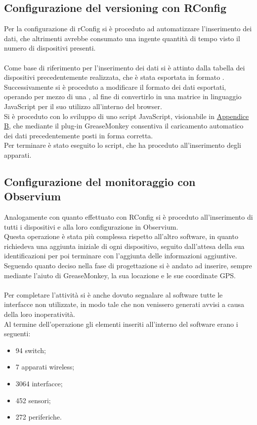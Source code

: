 \documentclass[Realizzazione.tex]{subfiles}
\begin{document}
\subsection{Configurazione del versioning con RConfig}
Per la configurazione di rConfig si è proceduto ad automatizzare l'inserimento dei dati, che altrimenti avrebbe consumato una ingente quantità di tempo visto il numero di dispositivi presenti. \\\\
Come base di riferimento per l'inserimento dei dati si è attinto dalla tabella dei dispositivi precedentemente realizzata, che è stata esportata in formato .\\
Successivamente si è proceduto a modificare il formato dei dati esportati, operando per mezzo di una , al fine di convertirlo in una matrice in linguaggio JavaScript per il suo utilizzo all'interno del browser. \\
Si è proceduto con lo sviluppo di uno script JavaScript, visionabile in \hyperref[sec:Appendice B]{Appendice B}, che mediante il plug-in GreaseMonkey consentiva il caricamento automatico dei dati precedentemente posti in forma corretta. \\
Per terminare è stato eseguito lo script, che ha proceduto all'inserimento degli apparati. \\

\subsection{Configurazione del monitoraggio con Observium}
Analogamente con quanto effettuato con RConfig si è proceduto all'inserimento di tutti i dispositivi e alla loro configurazione in Observium. \\
Questa operazione è stata più complessa rispetto all'altro software, in quanto richiedeva una aggiunta iniziale di ogni dispositivo, seguito dall'attesa della sua identificazioni per poi terminare con l'aggiunta delle informazioni aggiuntive. Seguendo quanto deciso nella fase di progettazione si è andato ad inserire, sempre mediante l'aiuto di GreaseMonkey, la sua locazione e le sue coordinate GPS. \\\\
Per completare l'attività si è anche dovuto segnalare al software tutte le interfacce non utilizzate, in modo tale che non venissero generati avvisi a causa della loro inoperatività.\\

Al termine dell'operazione gli elementi inseriti all'interno del software erano i seguenti:
\begin{itemize}
	\item 94 switch;
	\item 7 apparati wireless;
	\item 3064 interfacce;
	\item 452 sensori;
	\item 272 periferiche.
\end{itemize}
\end{document}
